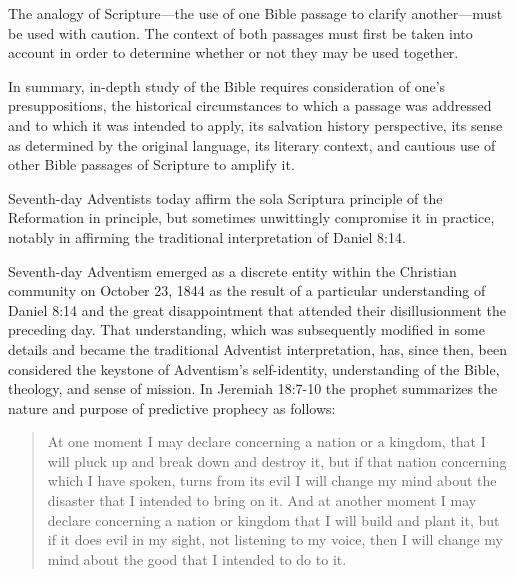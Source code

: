 The analogy of Scripture---the use of one Bible passage to clarify
another---must be used with caution. 
The context of both passages must 
first be taken into account in order to determine whether or not they may be
used together.

In summary, in-depth study of the Bible requires consideration of one's
presuppositions, the historical circumstances to which a passage was
addressed and to which it was intended to apply, its salvation history
perspective, its sense as determined by the original language, its literary
context, and cautious use of other Bible passages of Scripture to amplify
it.

Seventh-day Adventists today affirm the sola Scriptura principle of the
Reformation in principle, but sometimes unwittingly compromise it in
practice, notably in affirming the traditional interpretation of Daniel
8:14.

Seventh-day Adventism emerged as a discrete entity within the Christian
community on October 23, 1844 as the result of a particular understanding
of Daniel 8:14 and the great disappointment that attended their
disillusionment the preceding day. That understanding, which was
subsequently modified in some details and became the traditional Adventist
interpretation, has, since then, been considered the keystone of Adventism's
self-identity, understanding of the Bible, theology, and sense of mission.
In Jeremiah 18:7-10 the prophet summarizes the nature and purpose of
predictive prophecy as follows: 
\begin{quote}
At one moment I may declare concerning a nation or a
kingdom, that I will pluck up and break down and destroy it, but if that
nation concerning which I have spoken, turns from its evil I will change my
mind about the disaster that I intended to bring on it. And at another
moment I may declare concerning a nation or kingdom that I will build and
plant it, but if it does evil in my sight, not listening to my voice, then I
will change my mind about the good that I intended to do to it. 
\end{quote}

